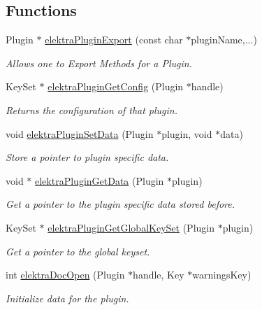 \subsection*{Functions}
\begin{DoxyCompactItemize}
\item 
Plugin $\ast$ \hyperlink{group__plugin_ga8dd092048e972a3f0c9c9f54eb41576e}{elektra\+Plugin\+Export} (const char $\ast$plugin\+Name,...)
\begin{DoxyCompactList}\small\item\em Allows one to Export Methods for a Plugin. \end{DoxyCompactList}\item 
Key\+Set $\ast$ \hyperlink{group__plugin_ga644bead796506c172817724051c977c9}{elektra\+Plugin\+Get\+Config} (Plugin $\ast$handle)
\begin{DoxyCompactList}\small\item\em Returns the configuration of that plugin. \end{DoxyCompactList}\item 
void \hyperlink{group__plugin_gaf4b941a52ff55d0ca2a9158d90208ef2}{elektra\+Plugin\+Set\+Data} (Plugin $\ast$plugin, void $\ast$data)
\begin{DoxyCompactList}\small\item\em Store a pointer to plugin specific data. \end{DoxyCompactList}\item 
void $\ast$ \hyperlink{group__plugin_gaafcf3216b46292f222b8cc7828b4dd20}{elektra\+Plugin\+Get\+Data} (Plugin $\ast$plugin)
\begin{DoxyCompactList}\small\item\em Get a pointer to the plugin specific data stored before. \end{DoxyCompactList}\item 
Key\+Set $\ast$ \hyperlink{group__plugin_ga436cda13ed70c0face08661a90620bf6}{elektra\+Plugin\+Get\+Global\+Key\+Set} (Plugin $\ast$plugin)
\begin{DoxyCompactList}\small\item\em Get a pointer to the global keyset. \end{DoxyCompactList}\item 
int \hyperlink{group__plugin_ga23c2eb3584e38a4d494eb8f91e5e3d8d}{elektra\+Doc\+Open} (Plugin $\ast$handle, Key $\ast$warnings\+Key)
\begin{DoxyCompactList}\small\item\em Initialize data for the plugin. \end{DoxyCompactList}\item 

\end{DoxyCompactItemize}
